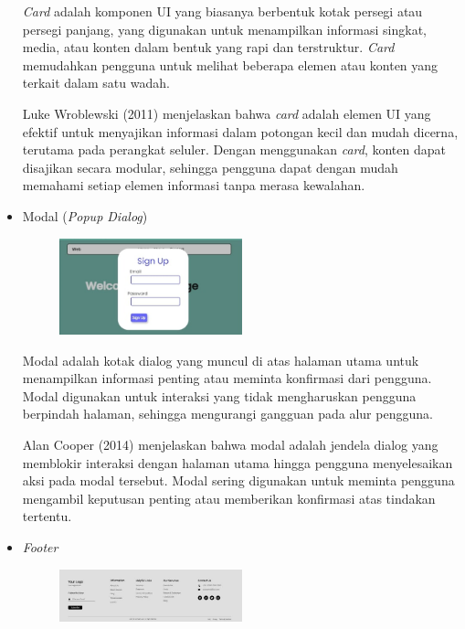 \documentclass[12pt]{article}
\begin{document}
\begin{itemize}
\par \emph{Card} adalah komponen UI yang biasanya berbentuk kotak persegi atau persegi panjang, yang digunakan untuk menampilkan informasi singkat, media, atau konten dalam bentuk yang rapi dan terstruktur. \emph{Card} memudahkan pengguna untuk melihat beberapa elemen atau konten yang terkait dalam satu wadah.

\par Luke Wroblewski (2011) menjelaskan bahwa \emph{card} adalah elemen UI yang efektif untuk menyajikan informasi dalam potongan kecil dan mudah dicerna, terutama pada perangkat seluler. Dengan menggunakan \emph{card}, konten dapat disajikan secara modular, sehingga pengguna dapat dengan mudah memahami setiap elemen informasi tanpa merasa kewalahan.

\item Modal (\emph{Popup Dialog})

\begin{figure}[h] %
    \centering
    \includegraphics[width=0.5\textwidth]{asset/popUp.png }
\end{figure}

\par Modal adalah kotak dialog yang muncul di atas halaman utama untuk menampilkan informasi penting atau meminta konfirmasi dari pengguna. Modal digunakan untuk interaksi yang tidak mengharuskan pengguna berpindah halaman, sehingga mengurangi gangguan pada alur pengguna.

\par Alan Cooper (2014) menjelaskan bahwa modal adalah jendela dialog yang memblokir interaksi dengan halaman utama hingga pengguna menyelesaikan aksi pada modal tersebut. Modal sering digunakan untuk meminta pengguna mengambil keputusan penting atau memberikan konfirmasi atas tindakan tertentu.

\item \emph{Footer}

\begin{figure}[h] %
    \centering
    \includegraphics[width=0.5\textwidth]{asset/footer.jpg}
\end{figure}


\end{itemize}
\end{document}
